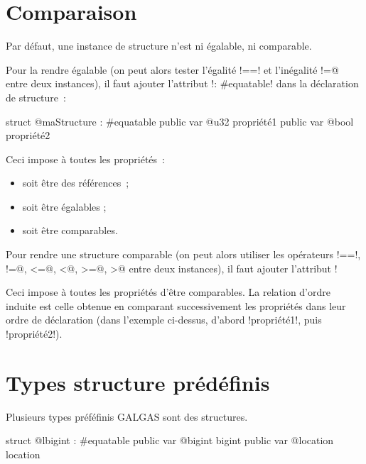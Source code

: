 \section{Comparaison}

Par défaut, une instance de structure n'est ni égalable, ni comparable.

Pour la rendre égalable (on peut alors tester l'égalité \ggsq!==! et l'inégalité \ggsq@!=@ entre deux instances), il faut ajouter l'attribut \ggsq!: #equatable! dans la déclaration de structure~:

\begin{galgas4}
struct @maStructure : #equatable {
  public var @u32 propriété1
  public var @bool propriété2
}
\end{galgas4}

Ceci impose à toutes les propriétés~:
\begin{itemize}
  \item soit être des références~;
  \item soit être égalables ;
  \item soit être comparables.
\end{itemize}



Pour rendre une structure comparable (on peut alors utiliser les opérateurs \ggsq!==!, \ggsq@!=@, \ggsq@<=@, \ggsq@<@, \ggsq@>=@, \ggsq@>@ entre deux instances), il faut ajouter l'attribut \ggsq!%


Ceci impose à toutes les propriétés d'être comparables. La relation d'ordre induite est celle obtenue en comparant successivement les propriétés dans leur ordre de déclaration (dans l'exemple ci-dessus, d'abord \ggsq!propriété1!, puis \ggsq!propriété2!).






\section{Types structure prédéfinis}

Plusieurs types préféfinis GALGAS sont des structures.


\begin{galgas4}
struct @lbigint : #equatable {
  public var @bigint bigint
  public var @location location
}
\end{galgas4}



